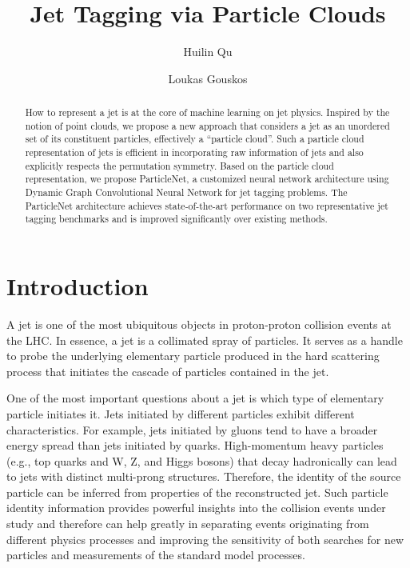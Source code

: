 \documentclass[aps,prd,longbibliography,reprint,amsmath,amssymb,amsfonts]{revtex4-1}
\begin{document}
\title{Jet Tagging via Particle Clouds}

\author{Huilin Qu}
\author{Loukas Gouskos}

\begin{abstract}

How to represent a jet is at the core of machine learning on jet physics. Inspired by the notion of point clouds, we propose a new approach that considers a jet as an unordered set of its constituent particles, effectively a ``particle cloud''. Such a particle cloud representation of jets is efficient in incorporating raw information of jets and also explicitly respects the permutation symmetry. Based on the particle cloud representation, we propose ParticleNet, a customized neural network architecture using Dynamic Graph Convolutional Neural Network for jet tagging problems. The ParticleNet architecture achieves state-of-the-art performance on two representative jet tagging benchmarks and is improved significantly over existing methods.

\end{abstract}


\maketitle

\section{Introduction}
\label{sec:introduction}

A jet is one of the most ubiquitous objects in proton-proton collision events at the LHC. In essence, a jet is a collimated spray of particles. It serves as a handle to probe the underlying elementary particle produced in the hard scattering process that initiates the cascade of particles contained in the jet. 

One of the most important questions about a jet is which type of elementary particle initiates it. Jets initiated by different particles exhibit different characteristics. For example, jets initiated by gluons tend to have a broader energy spread than jets initiated by quarks. High-momentum heavy particles (e.g., top quarks and W, Z, and Higgs bosons) that decay hadronically can lead to jets with distinct multi-prong structures. Therefore, the identity of the source particle can be inferred from properties of the reconstructed jet. Such particle identity information provides powerful insights into the collision events under study and therefore can help greatly in separating events originating from different physics processes and improving the sensitivity of both searches for new particles and measurements of the standard model processes.
\end{document}
